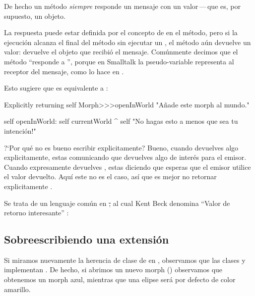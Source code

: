 \documentclass[a4paper,10pt,twoside]{book}
\begin{document}
De hecho un m\'etodo \emph{siempre} responde un mensaje con un valor\,---\,que es, por supuesto, un objeto.

La respuesta puede estar definida por el concepto de \ct{^} en el m\'etodo, pero si la ejecuci\'on alcanza el final del m\'etodo sin ejecutar un \ct{^}, el m\'etodo a\'un devuelve un valor: devuelve el objeto que recibi\'o el mensaje.
Com\'unmente decimos que el m\'etodo ``responde a \self'', porque en Smalltalk la pseudo-variable \self representa al receptor del mensaje, como lo hace  en .

Esto sugiere que  es equivalente a :

\begin{method}[openInWorldReturnSelf]{Explicitly returning self}
Morph>>>openInWorld
	"A\~nade este morph al mundo."
	
    self openInWorld: self currentWorld
	^ self		"No hagas esto a menos que sea tu intenci\'on!"
\end{method}

?`Por qu\'e no es bueno escribir  explicitamente?
Bueno, cuando devuelves algo explicitamente, estas comunicando que devuelves algo de inter\'es para el emisor.
Cuando expresamente devuelves \self, estas diciendo que esperas que el emisor utilice el valor devuelto.
Aqu\'i este no es el caso, as\'i que es mejor no retornar explicitamente \self.

Se trata de un lenguaje com\'un en \st, al cual Kent Beck denomina ``Valor de retorno interesante'' \cite{Beck97a}:


\subsection{Sobreescribiendo una extensi\'on}

Si miramos nuevamente la herencia de clase de  en , observamos que las clases  y \mbox{} implementan .
De hecho, si abrimos un nuevo morph () observamos que obtenemos un morph azul, mientras que una elipse ser\'a por defecto de color amarillo.
\end{document}
